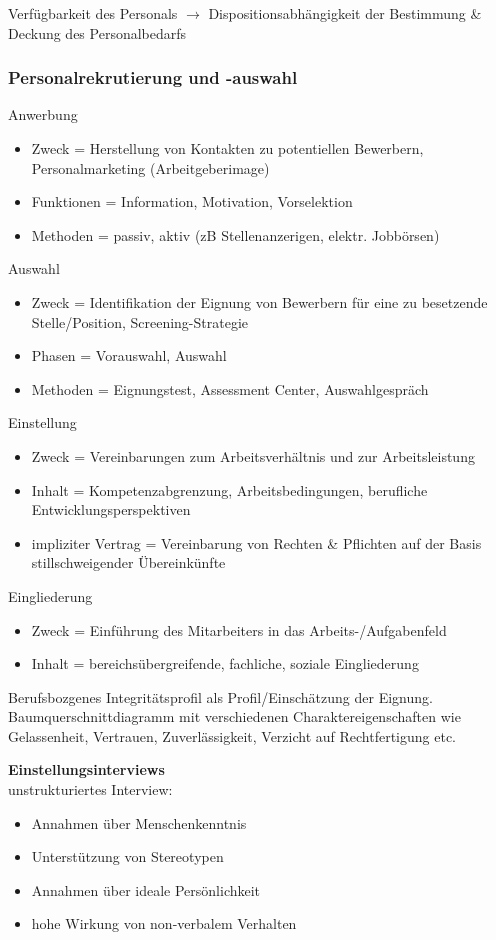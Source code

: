 \documentclass[11pt]{article}
\begin{document}
Verfügbarkeit des Personals \(\rightarrow\) Dispositionsabhängigkeit der Bestimmung \& Deckung des Personalbedarfs
\subsubsection{Personalrekrutierung und -auswahl}
\label{sec:org36f9d42}
Anwerbung
\begin{itemize}
\item Zweck = Herstellung von Kontakten zu potentiellen Bewerbern, Personalmarketing (Arbeitgeberimage)
\item Funktionen = Information, Motivation, Vorselektion
\item Methoden = passiv, aktiv (zB Stellenanzerigen, elektr. Jobbörsen)
\end{itemize}

Auswahl
\begin{itemize}
\item Zweck = Identifikation der Eignung von Bewerbern für eine zu besetzende Stelle/Position, Screening-Strategie
\item Phasen = Vorauswahl, Auswahl
\item Methoden = Eignungstest, Assessment Center, Auswahlgespräch
\end{itemize}

Einstellung
\begin{itemize}
\item Zweck = Vereinbarungen zum Arbeitsverhältnis und zur Arbeitsleistung
\item Inhalt = Kompetenzabgrenzung, Arbeitsbedingungen, berufliche Entwicklungsperspektiven
\item impliziter Vertrag =  Vereinbarung von Rechten \& Pflichten auf der Basis stillschweigender Übereinkünfte
\end{itemize}

Eingliederung
\begin{itemize}
\item Zweck = Einführung des Mitarbeiters in das Arbeits-/Aufgabenfeld
\item Inhalt = bereichsübergreifende, fachliche, soziale Eingliederung
\end{itemize}

Berufsbozgenes Integritätsprofil als Profil/Einschätzung der Eignung. Baumquerschnittdiagramm mit verschiedenen Charaktereigenschaften wie Gelassenheit, Vertrauen, Zuverlässigkeit, Verzicht auf Rechtfertigung etc.

\textbf{Einstellungsinterviews}\\
unstrukturiertes Interview:
\begin{itemize}
\item Annahmen über Menschenkenntnis
\item Unterstützung von Stereotypen
\item Annahmen über ideale Persönlichkeit
\item hohe Wirkung von non-verbalem Verhalten
\end{itemize}
\end{document}
